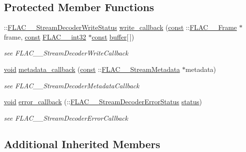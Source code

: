 \subsection*{Protected Member Functions}
\begin{DoxyCompactItemize}
\item 
\+::\hyperlink{group__flac__stream__decoder_ga73f67eb9e0ab57945afe038751bc62c8}{F\+L\+A\+C\+\_\+\+\_\+\+Stream\+Decoder\+Write\+Status} \hyperlink{class_our_file_decoder_adc2e54b154591ff1bd0bf456ca74309b}{write\+\_\+callback} (\hyperlink{getopt1_8c_a2c212835823e3c54a8ab6d95c652660e}{const} \+::\hyperlink{struct_f_l_a_c_____frame}{F\+L\+A\+C\+\_\+\+\_\+\+Frame} $\ast$frame, \hyperlink{getopt1_8c_a2c212835823e3c54a8ab6d95c652660e}{const} \hyperlink{ordinals_8h_a33fd77bfe6d685541a0c034a75deccdc}{F\+L\+A\+C\+\_\+\+\_\+int32} $\ast$\hyperlink{getopt1_8c_a2c212835823e3c54a8ab6d95c652660e}{const} \hyperlink{structbuffer}{buffer}\mbox{[}$\,$\mbox{]})
\begin{DoxyCompactList}\small\item\em see F\+L\+A\+C\+\_\+\+\_\+\+Stream\+Decoder\+Write\+Callback \end{DoxyCompactList}\item 
\hyperlink{sound_8c_ae35f5844602719cf66324f4de2a658b3}{void} \hyperlink{class_our_file_decoder_afb79ea3527fa5a85210c68ec14224d75}{metadata\+\_\+callback} (\hyperlink{getopt1_8c_a2c212835823e3c54a8ab6d95c652660e}{const} \+::\hyperlink{struct_f_l_a_c_____stream_metadata}{F\+L\+A\+C\+\_\+\+\_\+\+Stream\+Metadata} $\ast$metadata)
\begin{DoxyCompactList}\small\item\em see F\+L\+A\+C\+\_\+\+\_\+\+Stream\+Decoder\+Metadata\+Callback \end{DoxyCompactList}\item 
\hyperlink{sound_8c_ae35f5844602719cf66324f4de2a658b3}{void} \hyperlink{class_our_file_decoder_af8ff0f594d92084fbbb87ed9dead974e}{error\+\_\+callback} (\+::\hyperlink{group__flac__stream__decoder_ga130e70bd9a73d3c2416247a3e5132ecf}{F\+L\+A\+C\+\_\+\+\_\+\+Stream\+Decoder\+Error\+Status} \hyperlink{rfft2d_test_m_l_8m_a1b5437a866e6f95107b07ba845bc1800}{status})
\begin{DoxyCompactList}\small\item\em see F\+L\+A\+C\+\_\+\+\_\+\+Stream\+Decoder\+Error\+Callback \end{DoxyCompactList}\end{DoxyCompactItemize}
\subsection*{Additional Inherited Members}


